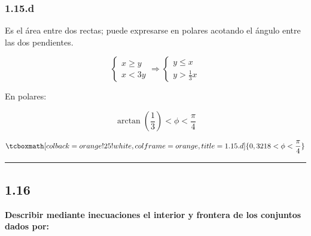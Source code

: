 \documentclass{article}
\begin{document}
\subsubsection*{1.15.d}
\label{subsubsec:1.15.d}

Es el área entre dos rectas; puede expresarse en polares acotando el ángulo entre las dos pendientes.

\begin{equation}
\left\{
\begin{array}{ll}
x \geq y \\
x < 3y
\end{array}
\right. \Rightarrow \left\{
\begin{array}{ll}
y \leq x \\
y > \frac{1}{3} x
\end{array}
\right.
\end{equation}

En polares:

\begin{equation}
\arctan \left( \frac{1}{3} \right) < \phi < \frac{\pi}{4}
\end{equation}

\begin{equation}
\tcboxmath[colback=orange!25!white,colframe=orange,title=1.15.d]
{ 0,3218 < \phi < \frac{\pi}{4} }
\end{equation}

\hrule
\vspace{10 pt}

\subsection*{1.16}
\label{subsec:1.16}

\textbf{Describir mediante inecuaciones el interior y frontera de los conjuntos dados por:}
\end{document}
